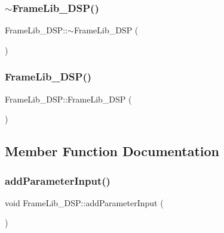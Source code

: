 \subsubsection{\texorpdfstring{$\sim$\+Frame\+Lib\+\_\+\+D\+S\+P()}{~FrameLib\_DSP()}}
{\footnotesize\ttfamily Frame\+Lib\+\_\+\+D\+S\+P\+::$\sim$\+Frame\+Lib\+\_\+\+D\+SP (\begin{DoxyParamCaption}{ }\end{DoxyParamCaption})}

\mbox{\label{class_frame_lib___d_s_p_afd70a8e76dc70ac0fbe4d3f9a7a5beaf}} 
\subsubsection{\texorpdfstring{Frame\+Lib\+\_\+\+D\+S\+P()}{FrameLib\_DSP()}\hspace{0.1cm}{\footnotesize\ttfamily [2/2]}}
{\footnotesize\ttfamily Frame\+Lib\+\_\+\+D\+S\+P\+::\+Frame\+Lib\+\_\+\+D\+SP (\begin{DoxyParamCaption}\item[{const \hyperlink{class_frame_lib___d_s_p}{Frame\+Lib\+\_\+\+D\+SP} \&}]{ }\end{DoxyParamCaption})\hspace{0.3cm}{\ttfamily [delete]}}



\subsection{Member Function Documentation}
\mbox{\label{class_frame_lib___d_s_p_aa000b56c19ad1fbdc4f3fe56b0ca762d}} 
\subsubsection{\texorpdfstring{add\+Parameter\+Input()}{addParameterInput()}}
{\footnotesize\ttfamily void Frame\+Lib\+\_\+\+D\+S\+P\+::add\+Parameter\+Input (\begin{DoxyParamCaption}{ }\end{DoxyParamCaption})\hspace{0.3cm}{\ttfamily [protected]}}

